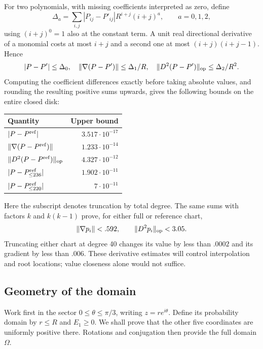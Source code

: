 \documentclass[11pt]{article}
\numberwithin{equation}{section}
\theoremstyle{definition}
\theoremstyle{remark}
\begin{document}
For two polynomials, with missing coefficients interpreted as zero, define
\[
 \Delta_a=\sum_{i,j}|P_{ij}-P'_{ij}|R^{i+j}(i+j)^a,
       \qquad a=0,1,2,
\]
using $(i+j)^0=1$ also at the constant term.  A unit real directional
derivative of a monomial costs at most $i+j$ and a second one at most
$(i+j)(i+j-1)$.  Hence
\begin{equation}\label{cert:jet-comparison}
 |P-P'|\leq\Delta_0,\quad
 \|\nabla(P-P')\|\leq\Delta_1/R,\quad
 \|D^2(P-P')\|_{\rm op}\leq\Delta_2/R^2.
\end{equation}
Computing the coefficient differences exactly before taking absolute values,
and rounding the resulting positive sums upwards, gives the following
bounds on the entire closed disk:
\begin{center}
\begin{tabular}{lr}\toprule
Quantity&Upper bound\\\midrule
$|P-P^{\rm ref}|$&$3.517\cdot10^{-17}$\\
$\|\nabla(P-P^{\rm ref})\|$&$1.233\cdot10^{-14}$\\
$\|D^2(P-P^{\rm ref})\|_{\rm op}$&$4.327\cdot10^{-12}$\\
$|P-P^{\rm ref}_{\leq236}|$&$1.902\cdot10^{-11}$\\
$|P-P^{\rm ref}_{\leq220}|$&$7\cdot10^{-11}$\\\bottomrule
\end{tabular}
\end{center}
Here the subscript denotes truncation by total degree.  The same sums with
factors $k$ and $k(k-1)$ prove, for either full or reference chart,
\begin{equation}\label{cert:chart-jets}
 \|\nabla p_i\|<.592,\qquad \|D^2p_i\|_{\rm op}<3.05.
\end{equation}
Truncating either chart at degree 40 changes its value by less than $.0002$
and its gradient by less than $.006$.  These derivative estimates will
control interpolation and root locations; value closeness alone would not
suffice.

\subsection{Geometry of the domain}
\label{cert:geometry}

Work first in the sector $0\leq\theta\leq\pi/3$, writing $z=re^{i\theta}$.
Define its probability domain by $r\leq R$ and $E_1\geq0$.  We shall prove
that the other five coordinates are uniformly positive there.  Rotations
and conjugation then provide the full domain $\Omega$.
\end{document}
